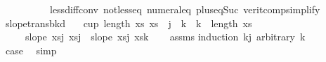 \begin{isabellebody}
\ \ \ \ \ \ \ \ \ \ less{\isacharunderscore}{\kern0pt}diff{\isacharunderscore}{\kern0pt}conv\ not{\isacharunderscore}{\kern0pt}less{\isacharunderscore}{\kern0pt}eq\ numeral{\isacharunderscore}{\kern0pt}{}{\isacharunderscore}{\kern0pt}eq{\isacharunderscore}{\kern0pt}{}\ plus{\isacharunderscore}{\kern0pt}{}{\isacharunderscore}{\kern0pt}eq{\isacharunderscore}{\kern0pt}Suc\ verit{\isacharunderscore}{\kern0pt}comp{\isacharunderscore}{\kern0pt}simplify{}{\isacharparenleft}{\kern0pt}{}{\isacharparenright}{\kern0pt}{\isacharparenright}{\kern0pt}\isanewline
\ \ \isamarkupfalse%
\isanewline
{}\isamarkupfalse%
%
\endisatagproof
{\isafoldproof}%
%
\isadelimproof
\isanewline
%
\endisadelimproof
\isanewline
{}\isamarkupfalse%
\ slope{\isacharunderscore}{\kern0pt}trans{\isacharunderscore}{\kern0pt}bkd{\isacharcolon}{\kern0pt}\isanewline
\ \ \ {\isachardoublequoteopen}cup\ {\isacharparenleft}{\kern0pt}length\ xs{\isacharparenright}{\kern0pt}\ xs{\isachardoublequoteclose}\ \ {\isachardoublequoteopen}j{\isacharplus}{\kern0pt}{}\ {\isacharless}{\kern0pt}\ k\ {\isasymand}\ k\ {\isacharless}{\kern0pt}\ length\ xs{\isachardoublequoteclose}\isanewline
\ \ \ \ \ {\isachardoublequoteopen}slope\ {\isacharparenleft}{\kern0pt}xs{\isacharbang}{\kern0pt}j{\isacharparenright}{\kern0pt}\ {\isacharparenleft}{\kern0pt}xs{\isacharbang}{\kern0pt}{\isacharparenleft}{\kern0pt}j{\isacharplus}{\kern0pt}{}{\isacharparenright}{\kern0pt}{\isacharparenright}{\kern0pt}\ {\isacharless}{\kern0pt}\ slope\ {\isacharparenleft}{\kern0pt}xs{\isacharbang}{\kern0pt}j{\isacharparenright}{\kern0pt}\ {\isacharparenleft}{\kern0pt}xs{\isacharbang}{\kern0pt}k{\isacharparenright}{\kern0pt}{\isachardoublequoteclose}\isanewline
%
\isadelimproof
\ \ %
\endisadelimproof
%
\isatagproof
{}\isamarkupfalse%
\ assms{\isacharparenleft}{\kern0pt}{}{\isacharparenright}{\kern0pt}\isanewline
{}\isamarkupfalse%
{\isacharparenleft}{\kern0pt}induction\ {\isachardoublequoteopen}k{\isacharminus}{\kern0pt}j{\isachardoublequoteclose}\ arbitrary{\isacharcolon}{\kern0pt}\ k{\isacharparenright}{\kern0pt}\isanewline
\ \ \isamarkupfalse%
\ {}\isanewline
\ \ \isamarkupfalse%
\ \isamarkupfalse%
\ {\isacharquery}{\kern0pt}case\ \isamarkupfalse%
\ simp\isanewline
{}\isamarkupfalse%
\isanewline

\end{isabellebody}
